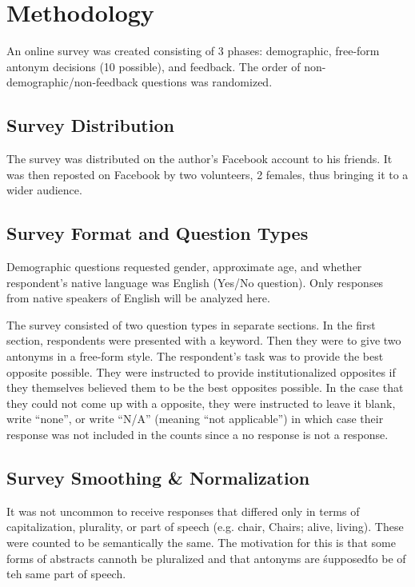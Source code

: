 \section {Methodology}
An online survey was created consisting of 3 phases: demographic, free-form antonym decisions (10 possible), and feedback.  The order of non-demographic/non-feedback questions was randomized.  %

\subsection{Survey Distribution} The survey was distributed on the author’s Facebook account to his friends.  It was then reposted on Facebook by two volunteers, 2 females, thus bringing it to a wider audience.  

\subsection{Survey Format and Question Types} Demographic questions requested gender, approximate age, and whether respondent’s native language was English (Yes/No question).  Only responses from native speakers of English will be analyzed here. 

The survey consisted of two question types in separate sections. In the first section, respondents were presented with a keyword. Then they were to give two antonyms in a free-form style. The respondent’s task was to provide the best opposite possible.  They were instructed to provide institutionalized opposites if they themselves believed them to be the best opposites possible. In the case that they could not come up with a opposite, they were instructed to leave it blank, write “none”, or write “N/A” (meaning “not applicable”) in which case their response was not included in the counts since a no response is not a response.  

\subsection{Survey Smoothing \& Normalization} It was not uncommon to receive responses that differed only in terms of capitalization, plurality, or part of speech (e.g. chair, Chairs; alive, living).  These were counted to be semantically the same.  The motivation for this is that some forms of abstracts cannoth be pluralized and that antonyms are \'supposed\' to be of teh same part of speech.

